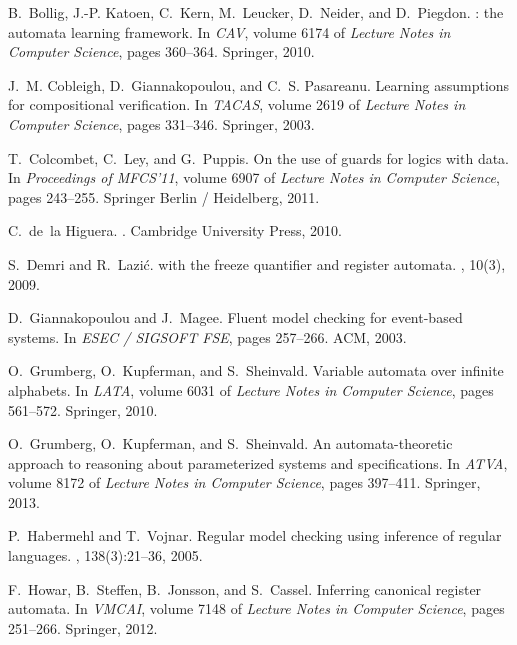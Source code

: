 \documentclass{LMCS}
\begin{document}
\begin{thebibliography}{10}
B.~Bollig, J.-P. Katoen, C.~Kern, M.~Leucker, D.~Neider, and D.~Piegdon.
: the automata learning framework.
\newblock In {\em CAV}, volume 6174 of {\em Lecture Notes in Computer Science},
  pages 360--364. Springer, 2010.

J.~M. Cobleigh, D.~Giannakopoulou, and C.~S. Pasareanu.
\newblock Learning assumptions for compositional verification.
\newblock In {\em TACAS}, volume 2619 of {\em Lecture Notes in Computer
  Science}, pages 331--346. Springer, 2003.

T.~Colcombet, C.~Ley, and G.~Puppis.
\newblock On the use of guards for logics with data.
\newblock In {\em Proceedings of MFCS'11}, volume 6907 of {\em Lecture Notes in
  Computer Science}, pages 243--255. Springer Berlin / Heidelberg, 2011.

C.~de~la Higuera.
.
\newblock Cambridge University Press, 2010.

S.~Demri and R.~Lazi{\'c}.
 with the freeze quantifier and register automata.
, 10(3), 2009.

D.~Giannakopoulou and J.~Magee.
\newblock Fluent model checking for event-based systems.
\newblock In {\em ESEC / SIGSOFT FSE}, pages 257--266. ACM, 2003.

O.~Grumberg, O.~Kupferman, and S.~Sheinvald.
\newblock Variable automata over infinite alphabets.
\newblock In {\em LATA}, volume 6031 of {\em Lecture Notes in Computer
  Science}, pages 561--572. Springer, 2010.

O.~Grumberg, O.~Kupferman, and S.~Sheinvald.
\newblock An automata-theoretic approach to reasoning about parameterized
  systems and specifications.
\newblock In {\em ATVA}, volume 8172 of {\em Lecture Notes in Computer
  Science}, pages 397--411. Springer, 2013.

P.~Habermehl and T.~Vojnar.
\newblock Regular model checking using inference of regular languages.
,
  138(3):21--36, 2005.

F.~Howar, B.~Steffen, B.~Jonsson, and S.~Cassel.
\newblock Inferring canonical register automata.
\newblock In {\em VMCAI}, volume 7148 of {\em Lecture Notes in Computer
  Science}, pages 251--266. Springer, 2012.


\end{thebibliography}
\end{document}
